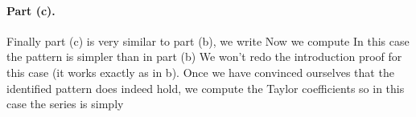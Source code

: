 \paragraph{Part (c).}Finally part (c) is very similar to part (b), we write 
Now we compute 
In this case the pattern is simpler than in part (b) 
We won't redo the introduction proof for this case (it works exactly as in b). Once we have convinced ourselves that the identified pattern does indeed hold, we compute the Taylor coefficients 
so in this case the series is simply
